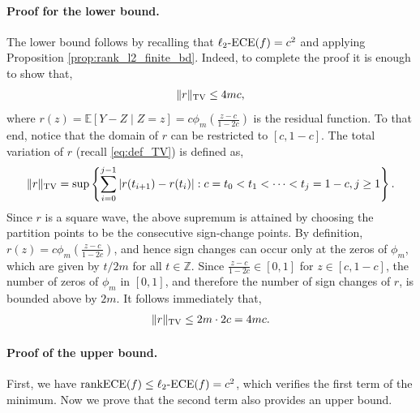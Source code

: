 \documentclass[11pt]{article}
\numberwithin{equation}{section}
\theoremstyle{definition}
\newcommand{\E}{\mathbb{E}}
\newcommand{\ECE}{\mathrm{ECE}}
\newcommand{\lECE}{\ell_2\textnormal{-}\ECE}
\newcommand{\rankECE}{\mathrm{rankECE}}
\begin{document}
\paragraph{\textbf{Proof for the lower bound.}} The lower bound follows by recalling that $\lECE(f) = c^2$ and applying Proposition \ref{prop:rank_l2_finite_bd}. Indeed, to complete the proof it is enough to show that,
\begin{align*}
    \|r\|_{\textnormal{TV}}\leq 4mc,
\end{align*}
where $r(z) = \E[Y-Z\mid Z = z] = c\phi_m\left(\frac{z-c}{1-2c}\right)$ is the residual function. To that end, notice that the domain of $r$ can be restricted to $[c, 1-c]$. The total variation of $r$ (recall \eqref{eq:def_TV}) is defined as,
\begin{align*}
    \|r\|_{\textnormal{TV}} = \sup\left\{\sum_{i = 0}^{j-1}\left|r(t_{i+1}) - r(t_i)\right|: c = t_0<t_1<\cdots<t_j = 1-c, j\geq 1\right\}.
\end{align*}
Since $r$ is a square wave, the above supremum is attained by choosing the partition points to be the consecutive sign-change points. By definition, $r(z)=c\phi_m\left(\frac{z-c}{1-2c}\right)$, and hence sign changes can occur only at the zeros of $\phi_m$, which are given by $t/2m$ for all $t\in\mathbb{Z}$. Since $\frac{z-c}{1-2c}\in[0,1]$ for $z\in[c,1-c]$, the number of zeros of $\phi_m$ in $[0,1]$, and therefore the number of sign changes of $r$, is bounded above by $2m$. It follows immediately that,
\begin{align*}
    \|r\|_{\textnormal{TV}}\leq 2m\cdot 2c = 4mc.
\end{align*}

\paragraph{\textbf{Proof of the upper bound.}}
First, we have $\rankECE(f) \leq \lECE(f) = c^2$, which verifies the first term of the minimum. Now we prove that the second term also provides an upper bound.
\end{document}
